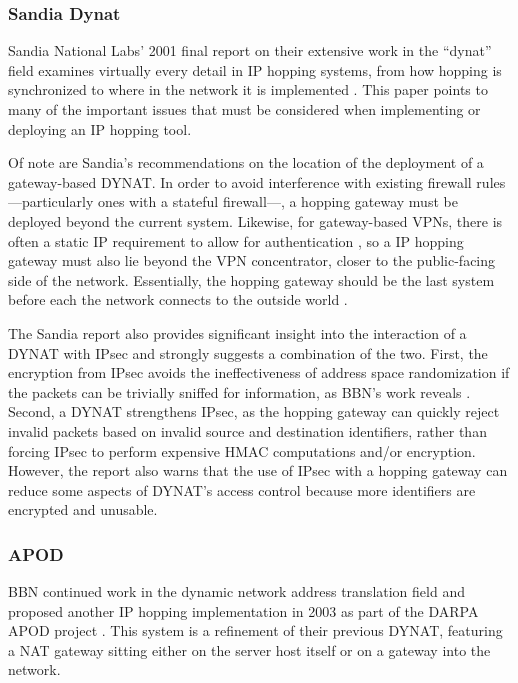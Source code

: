 \subsubsection{Sandia Dynat}
\par Sandia National Labs' 2001 final report on their extensive work in the ``dynat'' field examines virtually every detail in \ac{IP} hopping systems, from how hopping is synchronized to where in the network it is implemented \cite{SandiaDynat}. This paper points to many of the important issues that must be considered when implementing or deploying an \ac{IP} hopping tool.

\par Of note are Sandia's recommendations on the location of the deployment of a gateway-based \ac{DYNAT}. In order to avoid interference with existing firewall rules---particularly ones with a stateful firewall---, a hopping gateway must be deployed beyond the current system. Likewise, for gateway-based \acp{VPN}, there is often a static \ac{IP} requirement to allow for authentication \cite{SandiaDynat}, so a IP hopping gateway must also lie beyond the \ac{VPN} concentrator, closer to the public-facing side of the network. Essentially, the hopping gateway should be the last system before each the network connects to the outside world \cite{SandiaDynat}.

\par The Sandia report also provides significant insight into the interaction of a \ac{DYNAT} with \ac{IPsec} and strongly suggests a combination of the two. First, the encryption from \ac{IPsec} avoids the ineffectiveness of address space randomization if the packets can be trivially sniffed for information, as BBN's work reveals \cite{BBNDYNAT}. Second, a \ac{DYNAT} strengthens \ac{IPsec}, as the hopping gateway can quickly reject invalid packets based on invalid source and destination identifiers, rather than forcing IPsec to perform expensive \ac{HMAC} computations and/or encryption. However, the report also warns that the use of IPsec with a hopping gateway can reduce some aspects of \ac{DYNAT}'s access control because more identifiers are encrypted and unusable.

\subsubsection{\acf{APOD}}
\par BBN continued work in the dynamic network address translation field and proposed another IP hopping implementation in 2003 as part of the \ac{DARPA} \ac{APOD} project \cite{APOD}. This system is a refinement of their previous \ac{DYNAT}, featuring a \ac{NAT} gateway sitting either on the server host itself or on a gateway into the network.


